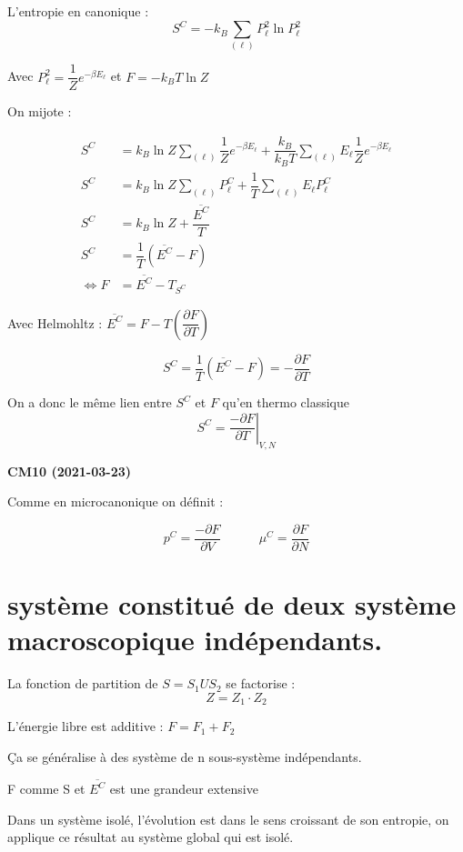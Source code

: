 \documentclass[12pt,a4paper]{report}
\begin{document}
L'entropie en canonique :
\[
	S^C = -k_B \sum_{(\ell)} P_\ell^2 \ln P_\ell^2
\]

Avec \(P_\ell^2 = \dfrac{1}{Z} e^{-\beta E_\ell}\) et \(F = -k_B T \ln Z\)

On mijote :

\begin{align*}
	S^C &= k_B \ln Z \sum_{(\ell)} \dfrac{1}{Z} e^{-\beta E_\ell} + \dfrac{k_B}{k_B T} \sum_{(\ell)} E_\ell \dfrac{1}{Z} e^{-\beta E_\ell}\\
	S^C &= k_B \ln Z \sum_{(\ell)} P_\ell^C + \dfrac{1}{T} \sum_{(\ell)} E_\ell P_\ell^C\\
	S^C &= k_B \ln Z + \dfrac{\overline{E^C}}{T}\\
	S^C &= \dfrac{1}{T} \left( \overline{E^C} - F \right)\\
	\Leftrightarrow F &= \overline{E^C} - T_{S^C}
\end{align*}

Avec Helmohltz : \(\overline{E^C} = F - T\left( \dfrac{\partial F}{\partial T} \right)\)

\[
	S^C = \dfrac{1}{T} \left( \overline{E^C} - F \right) = - \dfrac{\partial F}{\partial T}
\]

On a donc le même lien entre \(S^C\) et \(F\) qu'en thermo classique
\[
	S^C = \left. \dfrac{-\partial F}{\partial T}\right|_{V, N}
\]

\begin{center}
\textbf{CM10 (2021-03-23)}
\end{center}

Comme en microcanonique on définit :

\[
	p^C = \dfrac{-\partial F	}{\partial V} \quad \quad \quad \mu^C = \dfrac{\partial  F	}{\partial N }
\]

\section{système constitué de deux système macroscopique indépendants.}

La fonction de partition de $S = S_1 U S_2$ se factorise :
\[
	Z = Z_1 \cdot Z_2
\]

L'énergie libre est additive : \( F = F_1 + F_2 \)

Ça se généralise à des système de n sous-système indépendants.

F comme S et $\overline{E^C}$ est une grandeur extensive

Dans un système isolé, l'évolution est dans le sens croissant de son entropie, on applique ce résultat au système global qui est isolé.
\end{document}
